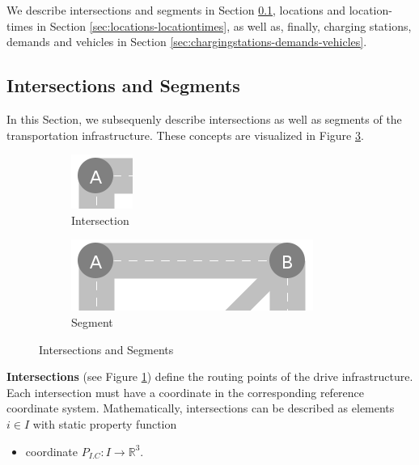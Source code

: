 \documentclass[graybox]{svmult}
\begin{document}
We describe intersections and segments in Section \ref{sec:intersections-segments}, locations and location-times in Section \ref{sec:locations-locationtimes}, as well as, finally, charging stations, demands and vehicles in Section \ref{sec:chargingstations-demands-vehicles}.

\subsection{Intersections and Segments}
\label{sec:intersections-segments}
In this Section, we subsequenly describe intersections as well as segments of the transportation infrastructure. These concepts are visualized in Figure \ref{fig:intersections-segments}.

\begin{figure}
	\begin{subfigure}{.5\textwidth}
		\centering
		\includegraphics[scale=0.4]{../../concepts/intersection.png}
		\caption{Intersection}
		\label{fig:intersection}
	\end{subfigure}
	\hfill
	\begin{subfigure}{.5\textwidth}
		\centering
		\includegraphics[scale=0.4]{../../concepts/segment.png}
		\caption{Segment}
		\label{fig:segment}
	\end{subfigure}
	\hfill
	\caption{Intersections and Segments}
	\label{fig:intersections-segments}	
\end{figure}

\noindent
\textbf{Intersections} (see Figure \ref{fig:intersection})
define the routing points of the drive infrastructure.
Each intersection must have a coordinate in the corresponding reference coordinate system.
Mathematically, intersections can be described as elements $i \in I$ with static property function
\begin{itemize}
	\item coordinate $P_{I.C}: I \rightarrow \mathbb{R}^3$.
\end{itemize}
\vspace{2mm}
\end{document}
